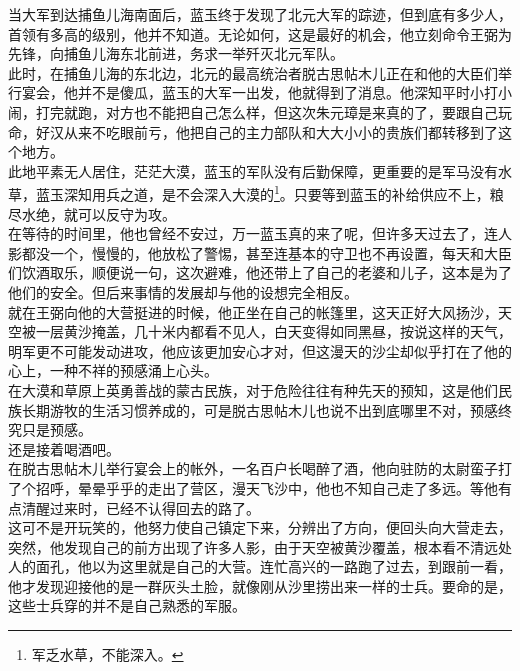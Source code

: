 \begin{multicols}{\theparacolNo}
当大军到达捕鱼儿海南面后，蓝玉终于发现了北元大军的踪迹，但到底有多少人，首领有多高的级别，他并不知道。无论如何，这是最好的机会，他立刻命令王弼为先锋，向捕鱼儿海东北前进，务求一举歼灭北元军队。\\

此时，在捕鱼儿海的东北边，北元的最高统治者脱古思帖木儿正在和他的大臣们举行宴会，他并不是傻瓜，蓝玉的大军一出发，他就得到了消息。他深知平时小打小闹，打完就跑，对方也不能把自己怎么样，但这次朱元璋是来真的了，要跟自己玩命，好汉从来不吃眼前亏，他把自己的主力部队和大大小小的贵族们都转移到了这个地方。\\

此地平素无人居住，茫茫大漠，蓝玉的军队没有后勤保障，更重要的是军马没有水草，蓝玉深知用兵之道，是不会深入大漠的\footnote{军乏水草，不能深入。}。只要等到蓝玉的补给供应不上，粮尽水绝，就可以反守为攻。\\

在等待的时间里，他也曾经不安过，万一蓝玉真的来了呢，但许多天过去了，连人影都没一个，慢慢的，他放松了警惕，甚至连基本的守卫也不再设置，每天和大臣们饮酒取乐，顺便说一句，这次避难，他还带上了自己的老婆和儿子，这本是为了他们的安全。但后来事情的发展却与他的设想完全相反。\\

就在王弼向他的大营挺进的时候，他正坐在自己的帐篷里，这天正好大风扬沙，天空被一层黄沙掩盖，几十米内都看不见人，白天变得如同黑昼，按说这样的天气，明军更不可能发动进攻，他应该更加安心才对，但这漫天的沙尘却似乎打在了他的心上，一种不祥的预感涌上心头。\\

在大漠和草原上英勇善战的蒙古民族，对于危险往往有种先天的预知，这是他们民族长期游牧的生活习惯养成的，可是脱古思帖木儿也说不出到底哪里不对，预感终究只是预感。\\

还是接着喝酒吧。\\

在脱古思帖木儿举行宴会上的帐外，一名百户长喝醉了酒，他向驻防的太尉蛮子打了个招呼，晕晕乎乎的走出了营区，漫天飞沙中，他也不知自己走了多远。等他有点清醒过来时，已经不认得回去的路了。\\

这可不是开玩笑的，他努力使自己镇定下来，分辨出了方向，便回头向大营走去，突然，他发现自己的前方出现了许多人影，由于天空被黄沙覆盖，根本看不清远处人的面孔，他以为这里就是自己的大营。连忙高兴的一路跑了过去，到跟前一看，他才发现迎接他的是一群灰头土脸，就像刚从沙里捞出来一样的士兵。要命的是，这些士兵穿的并不是自己熟悉的军服。\\


\end{multicols}

